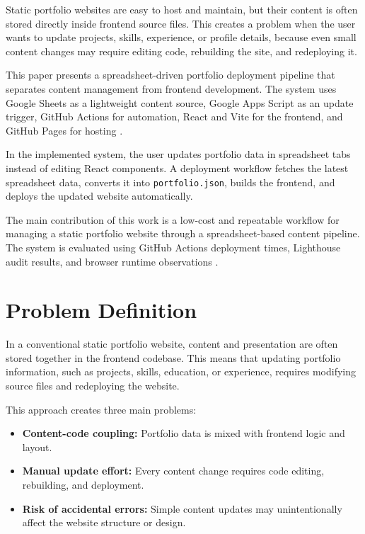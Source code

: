 \documentclass[10pt,a4paper,twocolumn]{article}
\begin{document}
Static portfolio websites are easy to host and maintain, but their content is often stored directly inside frontend source files. This creates a problem when the user wants to update projects, skills, experience, or profile details, because even small content changes may require editing code, rebuilding the site, and redeploying it.

This paper presents a spreadsheet-driven portfolio deployment pipeline that separates content management from frontend development. The system uses Google Sheets as a lightweight content source, Google Apps Script as an update trigger, GitHub Actions for automation, React and Vite for the frontend, and GitHub Pages for hosting \cite{googleSheetsApiDocs,googleAppsScriptDocs,githubActionsDocs,githubPagesDocs,reactDocs,viteDocs}.

In the implemented system, the user updates portfolio data in spreadsheet tabs instead of editing React components. A deployment workflow fetches the latest spreadsheet data, converts it into \texttt{portfolio.json}, builds the frontend, and deploys the updated website automatically.

The main contribution of this work is a low-cost and repeatable workflow for managing a static portfolio website through a spreadsheet-based content pipeline. The system is evaluated using GitHub Actions deployment times, Lighthouse audit results, and browser runtime observations \cite{lighthouseDocs,coreWebVitalsDocs}.

\section{Problem Definition}

In a conventional static portfolio website, content and presentation are often stored together in the frontend codebase. This means that updating portfolio information, such as projects, skills, education, or experience, requires modifying source files and redeploying the website.

This approach creates three main problems:

\begin{itemize}
\item \textbf{Content-code coupling:} Portfolio data is mixed with frontend logic and layout.
\item \textbf{Manual update effort:} Every content change requires code editing, rebuilding, and deployment.
\item \textbf{Risk of accidental errors:} Simple content updates may unintentionally affect the website structure or design.
\end{itemize}
\end{document}
